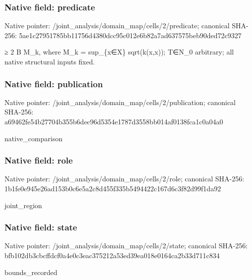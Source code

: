 \documentclass[10pt,a4paper]{article}
\begin{document}
\subsubsection{Native field: predicate}
Native pointer: /joint\_\allowbreak{}analysis/domain\_\allowbreak{}map/cells/2/predicate; canonical SHA-256: 5ae1c27951785bb11756d4380dcc95c012e6b82a7ad637575beb90ded72c9327

\begingroup\raggedright{}\allowbreak{} {\AtlasUnicodeSymbols ≥}\allowbreak{} 2 B M\_\allowbreak{}k,\allowbreak{} where M\_\allowbreak{}k =\allowbreak{} sup\_\allowbreak{}\{x{\AtlasUnicodeSymbols ∈}\allowbreak{}X\} sqrt(k(x,\allowbreak{}x));\allowbreak{} T{\AtlasUnicodeSymbols ∈}\allowbreak{}N\_\allowbreak{}0 arbitrary;\allowbreak{} all native structural inputs fixed.\par\endgroup

\subsubsection{Native field: publication}
Native pointer: /joint\_\allowbreak{}analysis/domain\_\allowbreak{}map/cells/2/publication; canonical SHA-256: a69462fe54b27704b355b6dec96d5354e1787d3558bb014af0138fca1c0a04a0

\begingroup\raggedright\sloppy native\_\allowbreak{}comparison\par\endgroup

\subsubsection{Native field: role}
Native pointer: /joint\_\allowbreak{}analysis/domain\_\allowbreak{}map/cells/2/role; canonical SHA-256: 1b1fe0e945e26ad153b0c6e5a2c8d455f335b5494422c167d6c3f82d99f1da92

\begingroup\raggedright\sloppy joint\_\allowbreak{}region\par\endgroup

\subsubsection{Native field: state}
Native pointer: /joint\_\allowbreak{}analysis/domain\_\allowbreak{}map/cells/2/state; canonical SHA-256: bfb102db3cbcffdcf0a4e0c3eac375212a53ed39ea018e0164ca2b33d711c834

\begingroup\raggedright\sloppy bounds\_\allowbreak{}recorded\par\endgroup
\end{document}
